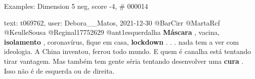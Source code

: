 \begin{frame}{Examples: Dimension 5 neg, score -4, \# 000014}
\footnotesize
\begin{alertblock}{text: t069762, user: Debora\_\_Matos, 2021-12-30}
@BarCirr @MartaRcf @KeulleSousa @Reginal17752629 @ant1esquerdalha 
\textbf{Máscara} , vacina, \textbf{isolamento} , coronavírus, fique em casa, 
\textbf{lockdown} . . . nada tem a ver com ideologia. A China inventou, ferrou 
todo mundo. E quem é canalha está tentando tirar vantagem. Mas também tem gente 
séria tentando desenvolver uma \textbf{cura} . Isso não é de esquerda ou de 
direita. 
\end{alertblock}
\end{frame}
